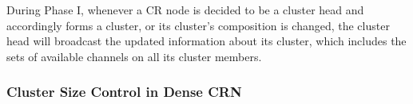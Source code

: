 \documentclass[10pt,journal,compsoc]{IEEEtran}
\theoremstyle{mytheoremstyle}
\theoremstyle{mytheoremstyle}
\theoremstyle{mytheoremstyle}
\begin{document}
During Phase I, whenever a CR node is decided to be a cluster head and accordingly forms a cluster, or its cluster's composition is changed, the cluster head will broadcast the updated information about its cluster, which includes the sets of available channels on all its cluster members.


\subsubsection{Cluster Size Control in Dense CRN}
\label{ross_p2_cluster_pruning}

%
\end{document}
